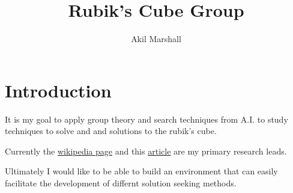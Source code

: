 \documentclass{article}
\title{Rubik's Cube Group}
\author{Akil Marshall}
\begin{document}
\maketitle
\section{Introduction}
It is my goal to apply group theory and search techniques from A.I. to study techniques to solve and and solutions to the rubik's cube.

Currently the \href{https://en.wikipedia.org/wiki/Rubik\%27s\_Cube\_group}{wikipedia page} and this \href{https://www.quora.com/Group-Theory-mathematics/Why-are-commutators-useful-for-solving-permutation-puzzles/answer/Mark-Eichenlaub}{article} are my primary research leads.

Ultimately I would like to be able to build an environment that can easily facilitate the development of differnt solution seeking methods.
\end{document}
